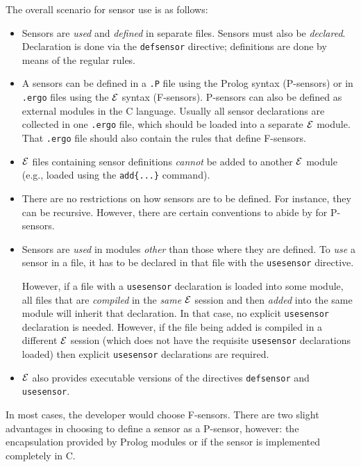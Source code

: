 \documentclass[11pt]{article}
\newcommand{\ERGO}{\mbox{\ensuremath{\cal{E}}\smaller{{\sc{RGO}}}}\xspace}
\newcommand{\FLSYSTEM}{\ERGO}
\newcommand{\ergoext}{ergo\xspace}
\begin{document}
The overall scenario for sensor use is as follows:
\begin{itemize}
\item  Sensors are \emph{used} and \emph{defined} in separate files.
  Sensors must also be \emph{declared}. 
  Declaration is done via the
  \texttt{defsensor} directive; definitions are done by means of the
  regular rules.
\item
  A sensors can be defined in a \texttt{.P} file
  using the Prolog syntax (P-sensors)  or in
  \texttt{.\ergoext} files using the \FLSYSTEM syntax (F-sensors). 
  P-sensors can also be defined as external modules in the C language.
  Usually all sensor declarations are collected in one \texttt{.\ergoext}
  file, which should be loaded into a separate \FLSYSTEM module. That
  \texttt{.\ergoext} file 
  should also contain the rules that define F-sensors. 
\item 
  \FLSYSTEM files containing sensor definitions \emph{cannot} be added to
  another \FLSYSTEM module (e.g., loaded 
  using the \texttt{add\{...\}} command).
\item
  There are no restrictions on how sensors are to be defined. For instance,
  they can be recursive. However, there are certain conventions to abide by
  for P-sensors.
\item  Sensors are \emph{used} in modules \emph{other} than those where they
  are defined. To \emph{use} a sensor in a file, it has to be declared
  in that file with the \texttt{usesensor} directive.

  However, if a file with a \texttt{usesensor} declaration is loaded into
  some module, all
  files that are \emph{compiled} in the \emph{same} \FLSYSTEM session  
  and then \emph{added}  into the same module will inherit that declaration.
  In that case, no explicit \texttt{usesensor} declaration is needed.
  However, if the file being added is compiled in a different \FLSYSTEM
  session (which does not have the requisite \texttt{usesensor}
  declarations loaded) then explicit \texttt{usesensor} declarations are
  required.  
\item \FLSYSTEM also provides executable versions of the directives 
  \texttt{defsensor} and \texttt{usesensor}.  
\end{itemize}

In most cases, the developer would choose F-sensors. There are two slight
advantages in choosing to define a sensor as a P-sensor, however: the encapsulation
provided by Prolog modules or if the sensor is implemented completely in C.
\end{document}
